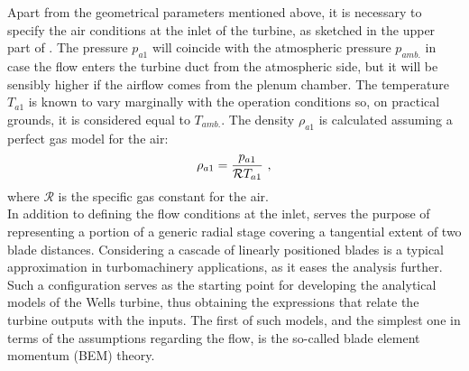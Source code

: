 \noindent Apart from the geometrical parameters mentioned above, it is necessary to specify the air conditions at the inlet of the turbine, as sketched in the upper part of . The pressure $p_{a1}$ will coincide with the atmospheric pressure $p_{amb.}$ in case the flow enters the turbine duct from the atmospheric side, but it will be sensibly higher if the airflow comes from the plenum chamber. The temperature $T_{a1}$ is known to vary marginally with the operation conditions so, on practical grounds, it is considered equal to $T_{amb.}$. The density $\rho_{a1}$ is calculated assuming a perfect gas model for the air:
\begin{equation}{\label{eq:perfect_gas_model_air}}
	\rho_{a1} = \frac{p_{a1}}{\mathcal{R}T_{a1}}\ ,
\end{equation}
where $\mathcal{R}$ is the specific gas constant for the air.\\
In addition to defining the flow conditions at the inlet,  serves the purpose of representing a portion of a generic radial stage covering a tangential extent of two blade distances. Considering a cascade of linearly positioned blades is a typical approximation in turbomachinery applications, as it eases the analysis further. Such a configuration serves as the starting point for developing the analytical models of the Wells turbine, thus obtaining the expressions that relate the turbine outputs with the inputs. The first of such models, and the simplest one in terms of the assumptions regarding the flow, is the so-called blade element momentum (BEM) theory.